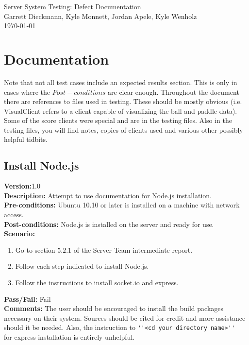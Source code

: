 \documentclass[12pt]{article}
\begin{document}
\begin{titlepage}
    \vspace*{\fill}
    \begin{center}
    {\Huge Server System Testing: Defect Documentation}\\[0.5cm]
    {\Large Garrett Dieckmann, Kyle Monnett, Jordan Apele, Kyle Wenholz}\\[0.4cm]
    \today
    \end{center}
    \vspace*{\fill}
 \end{titlepage}

\tableofcontents
\newpage


\section{Documentation}
\label{sec:documentationCases}
Note that not all test cases include an expected results section.  This is only in cases where the $Post-conditions$ are clear enough.  Throughout the document there are references to files used in testing.  These should be mostly obvious (i.e. VisualClient refers to a client capable of visualizing the ball and paddle data).  Some of the score clients were special and are in the testing files.  Also in the testing files, you will find notes, copies of clients used and various other possibly helpful tidbits.


    \subsection{Install Node.js}
    \textbf{Version:}1.0\\
    \textbf{Description:} Attempt to use documentation for Node.js installation.\\
    \textbf{Pre-conditions:} Ubuntu 10.10 or later is installed on a machine with network access.\\
    \textbf{Post-conditions:} Node.js is installed on the server and ready for use.\\
    \textbf{Scenario:}
    \begin{enumerate}
        \item Go to section $5.2.1$ of the Server Team intermediate report.
        \item Follow each step indicated to install Node.js.
        \item Follow the instructions to install socket.io and express.
    \end{enumerate}
    \textbf{Pass/Fail:} Fail\\
    \textbf{Comments:} The user should be encouraged to install the build packages necessary on their system.  Sources should be cited for credit and more assistance should it be needed.  Also, the instruction to \verb=''<cd your directory name>'' = for express installation is entirely unhelpful.\\
\end{document}
